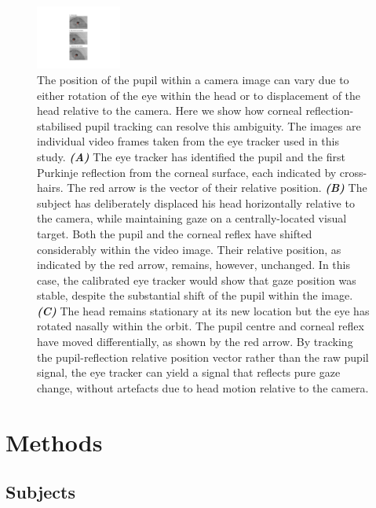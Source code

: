\documentclass[jou,a4paper]{apa6}
\begin{document}
\begin{figure}[htbp]
\begin{center}
\includegraphics [width=0.25\textwidth]{Figures/Figure_1_Explanatory}
\caption{The position of the pupil within a camera image can vary due to either rotation of the eye within the head or to displacement of the head relative to the camera. Here we show how corneal reflection-stabilised pupil tracking can resolve this ambiguity. The images are individual video frames taken from the eye tracker used in this study. \textbf{\textit{(A)}} The eye tracker has identified the pupil and the first Purkinje reflection from the corneal surface, each indicated by cross-hairs. The red arrow is the vector of their relative position. \textbf{\textit{(B)}} The subject has deliberately displaced his head horizontally relative to the camera, while maintaining gaze on a centrally-located visual target. Both the pupil and the corneal reflex have shifted considerably within the video image. Their relative position, as indicated by the red arrow, remains, however, unchanged. In this case, the calibrated eye tracker would show that gaze position was stable, despite the substantial shift of the pupil within the image. \textbf{\textit{(C)}} The head remains stationary at its new location but the eye has rotated nasally within the orbit. The pupil centre and corneal reflex have moved differentially, as shown by the red arrow. By tracking the pupil-reflection relative position vector rather than the raw pupil signal, the eye tracker can yield a signal that reflects pure gaze change, without artefacts due to head motion relative to the camera.}
\label{fig:PCCR}
\end{center}
\end{figure}

\section{Methods}

\subsection{Subjects}
\end{document}
